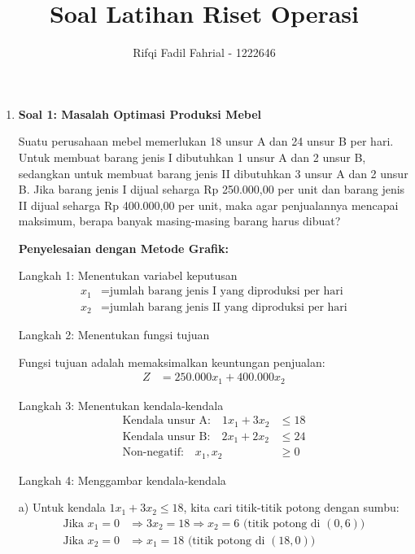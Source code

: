 \documentclass[12pt,a4paper]{article}
\title{Soal Latihan Riset Operasi}
\author{Rifqi Fadil Fahrial - 1222646}
\date{}
\begin{document}
\maketitle

\begin{enumerate}
    \item \textbf{Soal 1: Masalah Optimasi Produksi Mebel}
    
    Suatu perusahaan mebel memerlukan 18 unsur A dan 24 unsur B per hari. Untuk membuat barang jenis I dibutuhkan 1 unsur A dan 2 unsur B, sedangkan untuk membuat barang jenis II dibutuhkan 3 unsur A dan 2 unsur B. Jika barang jenis I dijual seharga Rp 250.000,00 per unit dan barang jenis II dijual seharga Rp 400.000,00 per unit, maka agar penjualannya mencapai maksimum, berapa banyak masing-masing barang harus dibuat?
    
    \textbf{Penyelesaian dengan Metode Grafik:}
    
    Langkah 1: Menentukan variabel keputusan
    \begin{align*}
    x_1 &= \text{jumlah barang jenis I yang diproduksi per hari} \\
    x_2 &= \text{jumlah barang jenis II yang diproduksi per hari}
    \end{align*}
    
    Langkah 2: Menentukan fungsi tujuan
    
    Fungsi tujuan adalah memaksimalkan keuntungan penjualan:
    \begin{align*}
    Z &= 250.000x_1 + 400.000x_2
    \end{align*}
    
    Langkah 3: Menentukan kendala-kendala
    \begin{align*}
    \text{Kendala unsur A:} \quad 1x_1 + 3x_2 &\leq 18 \\
    \text{Kendala unsur B:} \quad 2x_1 + 2x_2 &\leq 24 \\
    \text{Non-negatif:} \quad x_1, x_2 &\geq 0
    \end{align*}
    
    Langkah 4: Menggambar kendala-kendala
    
    a) Untuk kendala $1x_1 + 3x_2 \leq 18$, kita cari titik-titik potong dengan sumbu:
    \begin{align*}
    \text{Jika } x_1 = 0 &\Rightarrow 3x_2 = 18 \Rightarrow x_2 = 6 \text{ (titik potong di } (0,6)) \\
    \text{Jika } x_2 = 0 &\Rightarrow x_1 = 18 \text{ (titik potong di } (18,0))
    \end{align*}
    

\end{enumerate}
\end{document}
